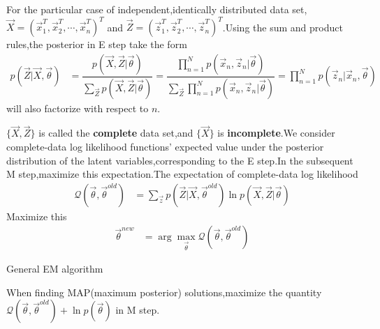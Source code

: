 For the particular case of independent,identically distributed data set,$\vec{X}=(\vec{x}_1^T,\vec{x}_2^T,\cdots,\vec{x}_n^T)^T$ and $\vec{Z}=(\vec{z}_1^T,\vec{z}_2^T,\cdots,\vec{z}_n^T)^T$.Using the sum and product rules,the posterior in E step take the form
\begin{align}
p(\vec{Z}|\vec{X},\vec{\theta}) &= \dfrac{p(\vec{X},\vec{Z}|\vec{\theta})}{\sum_{\vec{Z}}p(\vec{X},\vec{Z}|\vec{\theta})}
=\dfrac{\prod_{n=1}^{N}p(\vec{x}_n,\vec{z}_n|\vec{\theta})}{\sum_{\vec{Z}}\prod_{n=1}^{N}p(\vec{x}_n,\vec{z}_n|\vec{\theta})}
=\prod_{n=1}^{N}p(\vec{z}_n|\vec{x}_n,\vec{\theta})
\end{align}
will also factorize with respect to $n$.

$\{\vec{X},\vec{Z}\}$ is called the \textbf{complete} data set,and $\{\vec{X}\}$ is \textbf{incomplete}.We consider complete-data log likelihood functions' expected value under the posterior distribution of the latent variables,corresponding to the E step.In the subsequent M step,maximize this expectation.The expectation of complete-data log likelihood
\begin{align}
\mathcal{Q}(\vec{\theta},\vec{\theta}^{old}) &=
\sum_{\vec{z}}p(\vec{Z}|\vec{X},\vec{\theta}^{old})\ln p(\vec{X},\vec{Z}|\vec{\theta})
\end{align}
Maximize this
\begin{align}
\vec{\theta}^{new} &=\arg\max\limits_{\vec{\theta}}\mathcal{Q}(\vec{\theta},\vec{\theta}^{old})
\end{align}
\begin{algorithm}
	\label{General EM algorithm}
	\caption{General EM algorithm}
	\DontPrintSemicolon
\end{algorithm}
When finding MAP(maximum posterior) solutions,maximize the quantity $\mathcal{Q}(\vec{\theta},\vec{\theta}^{old})+\ln p(\vec{\theta})$ in M step.

